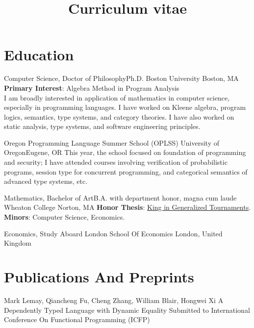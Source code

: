 \documentclass[11pt,roman]{moderncv}        %
\title{Curriculum vitae}
\begin{document}

\makecvtitle{}

\setlength{\parskip}{2.5px}
\linespread{1.3}
\selectfont


\section{Education}

{Computer Science, \iftechnical Doctor of Philosophy\else Ph.D.\fi} {}
{Boston University}
{Boston, MA}
{\textbf{Primary Interest}: Algebra Method in Program Analysis\\
\iftechnical
I am broadly interested in application of mathematics in computer science,
especially in programming languages.
I have worked on Kleene algebra, program logics, semantics, type systems,  and category theories.
\else 
I have also worked on static analysis, type systems, and software engineering principles.
\fi}  %


{Oregon Programming Language Summer School (OPLSS)}{}
{University of Oregon}{Eugene, OR}
{
\iftechnical
\else   
This year, the school focused on foundation of programming and security;
\fi
I have attended courses involving verification of probabilistic programs,
session type for concurrent programming, 
and categorical semantics of advanced type systems, etc.}


{Mathematics, \iftechnical Bachelor of Art\else B.A.\fi} {with department honor, magna cum laude}
{Wheaton College}
{Norton, MA}
{\textbf{Honor Thesis}: \href{http://hdl.handle.net/11040/24570}{King in Generalized Tournaments}.\\
\textbf{Minors}: Computer Science, Economics.
}

{Economics, Study Aboard} {}
{London School Of Economics}
{London, United Kingdom}
{}  %



\section{Publications And Preprints}

{Mark Lemay, Qiancheng Fu, Cheng Zhang, William Blair, Hongwei Xi}
{A Dependently Typed Language with Dynamic Equality}
{Submitted to International Conference On Functional Programming (ICFP)}{}{}
\end{document}
